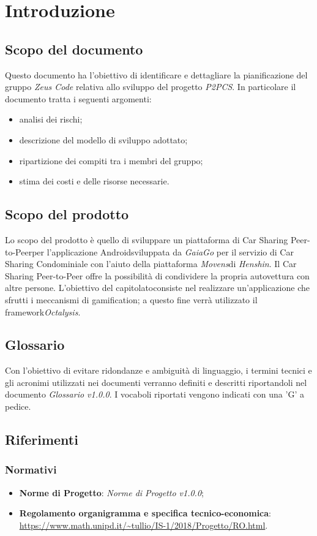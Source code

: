 \section{Introduzione}
\subsection{Scopo del documento}
Questo documento ha l'obiettivo di identificare e dettagliare la pianificazione del gruppo \textit{Zeus Code} relativa allo sviluppo del progetto \textit{P2PCS}. In particolare il documento tratta i seguenti argomenti:
\begin{itemize}
	\item analisi dei rischi;
	\item descrizione del modello di sviluppo adottato;
	\item ripartizione dei compiti tra i membri del gruppo;
	\item stima dei costi e delle risorse necessarie.
\end{itemize}
\subsection{Scopo del prodotto}
Lo scopo del prodotto è quello di sviluppare un piattaforma di Car Sharing Peer-to-Peer\glosp per l'applicazione Android\glosp sviluppata da \textit{GaiaGo} per il servizio di Car Sharing Condominiale con l'aiuto della piattaforma \textit{Movens}\glosp di \textit{Henshin}\glo. Il Car Sharing Peer-to-Peer offre la possibilità di condividere la propria autovettura con altre persone. L'obiettivo del capitolato\glosp consiste nel realizzare un'applicazione che sfrutti i meccanismi di gamification\glo; a questo fine
verrà utilizzato il framework\glosp \textit{Octalysis}\glo.
\subsection{Glossario}
Con l'obiettivo di evitare ridondanze e ambiguità di linguaggio, i termini tecnici e gli acronimi
utilizzati nei documenti verranno definiti e descritti riportandoli nel documento \textit{Glossario v1.0.0}.
I vocaboli riportati vengono indicati con una 'G' a pedice.
\subsection{Riferimenti}
\subsubsection{Normativi}
\begin{itemize}
	\item \textbf{Norme di Progetto}: \textit{Norme di Progetto v1.0.0};
	\item \textbf{Regolamento organigramma e specifica tecnico-economica}: \\
	\url{https://www.math.unipd.it/~tullio/IS-1/2018/Progetto/RO.html}.
\end{itemize}

